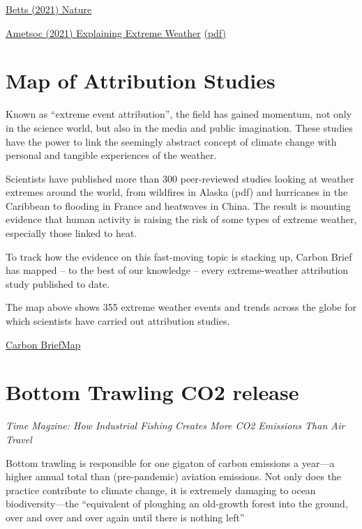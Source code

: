 \documentclass[
]{book}
\begin{document}
\href{https://www.nature.com/articles/d41586-021-00185-x}{Betts (2021) Nature}

\href{https://www.ametsoc.org/ams/index.cfm/publications/bulletin-of-the-american-meteorological-society-bams/explaining-extreme-events-from-a-climate-perspective/}{Ametsoc (2021) Explaining Extreme Weather}
\href{pdf/Ametsoc_2021_Explaining_Extreme_2019.pdf}{(pdf)}

\hypertarget{map-of-attribution-studies}{%
\section{Map of Attribution Studies}\label{map-of-attribution-studies}}

Known as ``extreme event attribution'', the field has gained momentum, not only in the science world, but also in the media and public imagination. These studies have the power to link the seemingly abstract concept of climate change with personal and tangible experiences of the weather.

Scientists have published more than 300 peer-reviewed studies looking at weather extremes around the world, from wildfires in Alaska (pdf) and hurricanes in the Caribbean to flooding in France and heatwaves in China. The result is mounting evidence that human activity is raising the risk of some types of extreme weather, especially those linked to heat.

To track how the evidence on this fast-moving topic is stacking up, Carbon Brief has mapped -- to the best of our knowledge -- every extreme-weather attribution study published to date.

The map above shows 355 extreme weather events and trends across the globe for which scientists have carried out attribution studies.

\href{https://www.carbonbrief.org/mapped-how-climate-change-affects-extreme-weather-around-the-world}{Carbon BriefMap}

\hypertarget{bottom-trawling-co2-release}{%
\section{Bottom Trawling CO2 release}\label{bottom-trawling-co2-release}}

\emph{Time Magzine: How Industrial Fishing Creates More CO2 Emissions Than Air Travel}

Bottom trawling is responsible for one gigaton of carbon emissions a year---a higher annual total than (pre-pandemic) aviation emissions. Not only does the practice contribute to climate change, it is extremely damaging to ocean biodiversity---the ``equivalent of ploughing an old-growth forest into the ground, over and over and over again until there is nothing left''
\end{document}
